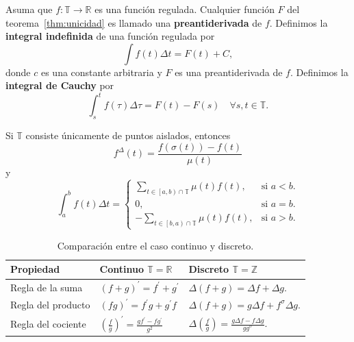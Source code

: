 \begin{frame}
	\begin{definition}
		Asuma que $f\colon\mathds{T}\rightarrow\mathds{R}$ es una función regulada. Cualquier función $F$ del teorema~\ref{thm:unicidad} es llamado una \textbf{preantiderivada} de $f$. Definimos la \textbf{integral indefinida} de una función regulada por \[ \int f\left(t\right)\Delta t=F\left(t\right)+C, \] donde $c$ es una constante arbitraria y $F$ es una preantiderivada de $f$. Definimos la \textbf{integral de Cauchy} por \[ \int_{s}^{t}f\left(\tau\right)\Delta\tau=F\left(t\right)-F\left(s\right)\quad\forall s,t\in\mathds{T}. \]
	\end{definition}
\end{frame}

\begin{frame}
\begin{claim}
	Si $\mathds{T}$ consiste únicamente de puntos aislados, entonces \[ f^{\Delta}\left(t\right)=\frac{f\left(\sigma\left(t\right)\right)-f\left(t\right)}{\mu\left(t\right)} \] y
	\[\int_{a}^{b}f\left(t\right)\Delta t=\begin{cases}\sum\limits_{t\in\left[a,b\right)\cap\mathds{T}}\mu\left(t\right)f\left(t\right),&\text{si }a<b.\\0, & \text{si } a = b.\\-\sum\limits_{t\in\left[b,a\right)\cap\mathds{T}}\mu\left(t\right)f\left(t\right), & \text{si }a>b.\end{cases} \]
\end{claim}
\end{frame}

\begin{frame}
	\begin{table}
		\caption{Comparación entre el caso continuo y discreto.}
		\small
		\begin{tabular}{lll}
			\toprule
			Propiedad 														& Continuo $\mathds{T}=\mathds{R}$																						& Discreto $\mathds{T}=\mathds{Z}$\\
			\midrule
			\rowcolor{green!40} Regla de la suma	& ${\left(f+g\right)}^{\prime}=f^{\prime}+g^{\prime}$													& $\Delta\left(f+g\right)=\Delta f+\Delta g$.\\
			Regla del producto										& ${\left(fg\right)}^{\prime}=f^{\prime}g+g^{\prime}f$												& $\Delta\left(f+g\right)=g\Delta f+f^{\sigma}\Delta g$.\\
			\rowcolor{green!40} Regla del cociente& ${\left(\frac{f}{g}\right)}^{\prime}=\frac{gf^{\prime}-fg^{\prime}}{g^{2}}$	& $\Delta\left(\frac{f}{g}\right)=\frac{g\Delta f-f\Delta g}{gg^{\sigma}}$.\\
			\bottomrule
		\end{tabular}
	\end{table}
\end{frame}

